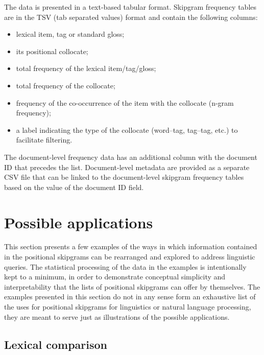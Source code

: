 \documentclass[12pt]{article}
\begin{document}
The data is presented in a text-based tabular format. Skipgram
frequency tables are in the TSV (tab separated values) format and
contain the following columns:
\begin{itemize}
\item lexical item, tag or standard gloss;
\item its positional collocate;
\item total frequency of the lexical item/tag/gloss;
\item total frequency of the collocate;
\item frequency of the co-occurrence of the item with the collocate
  (n-gram frequency);
\item a label indicating the type of the collocate (word--tag,
  tag--tag, etc.) to facilitate filtering.
\end{itemize}
The document-level frequency data has an additional column with the
document ID that precedes the list.  Document-level metadata are provided
as a separate CSV file that can be linked to the document-level
skipgram frequency tables based on the value of the document ID
field. 



\section{Possible applications}
\label{sec:applications}

This section presents a few examples of the ways in which information
contained in the positional skipgrams can be rearranged and explored
to address linguistic queries. The statistical processing of the data
in the examples is intentionally kept to a minimum, in order to
demonstrate conceptual simplicity and interpretability that the lists
of positional skipgrams can offer by themselves.  The examples
presented in this section do not in any sense form an exhaustive list
of the uses for positional skipgrams for linguistics or natural
language processing, they are meant to serve just as illustrations of
the possible applications.

\subsection{Lexical comparison}
\end{document}
